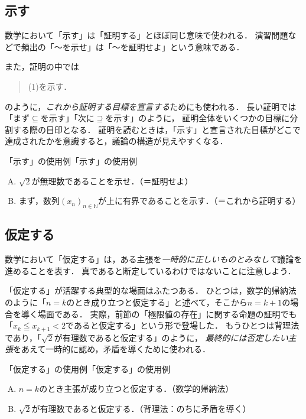 \subsection{示す}

数学において「示す」は「証明する」とほぼ同じ意味で使われる．
演習問題などで頻出の「〜を示せ」は「〜を証明せよ」という意味である．

また，証明の中では
\begin{quote}
  (1)を示す．
\end{quote}
のように，\emph{これから証明する目標を宣言する}ためにも使われる．
長い証明では「まず$\subseteq$を示す」「次に$\supseteq$を示す」のように，
証明全体をいくつかの目標に分割する際の目印となる．
証明を読むときは，「示す」と宣言された目標がどこで達成されたかを意識すると，議論の構造が見えやすくなる．

\begin{example}{「示す」の使用例}{「示す」の使用例}
  \begin{enumerate}[(A)]
    \item $\sqrt{2}$が無理数であることを示せ．（＝証明せよ）
    \item まず，数列$(x_n)_{n \in \mathbb{N}}$が上に有界であることを示す．（＝これから証明する）
  \end{enumerate}
\end{example}

\subsection{仮定する}

数学において「仮定する」は，ある主張を\emph{一時的に正しいものとみなして}議論を進めることを表す．
真であると断定しているわけではないことに注意しよう．

「仮定する」が活躍する典型的な場面はふたつある．
ひとつは，数学的帰納法のように「$n=k$のとき成り立つと仮定する」と述べて，そこから$n=k+1$の場合を導く場面である．
実際，前節の「極限値の存在」に関する命題の証明でも「$x_k \leqq x_{k+1} < 2$であると仮定する」という形で登場した．
もうひとつは背理法であり，「$\sqrt{2}$が有理数であると仮定する」のように，
\emph{最終的には否定したい主張}をあえて一時的に認め，矛盾を導くために使われる．

\begin{example}{「仮定する」の使用例}{「仮定する」の使用例}
  \begin{enumerate}[(A)]
    \item $n=k$のとき主張が成り立つと仮定する．（数学的帰納法）
    \item $\sqrt{2}$が有理数であると仮定する．（背理法：のちに矛盾を導く）
  \end{enumerate}
\end{example}


